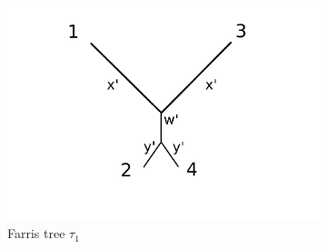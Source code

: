 \documentclass{article}
\begin{document}
\begin{figure}
\centering
\begin{subfigure}{.45\linewidth}
\centering
\includegraphics[width=.95\textwidth]{farris_blank}
\caption[short]{Farris tree $\tau_1$}
\end{subfigure}
\begin{subfigure}{.45\linewidth}
\centering

\end{subfigure}
\end{figure}
\end{document}
